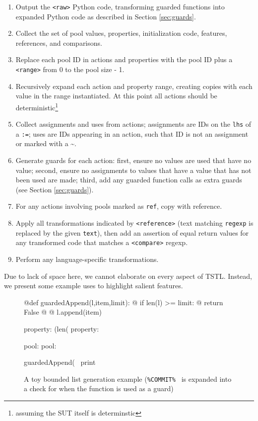 \documentclass[runningheads,a4paper]{llncs}
\begin{document}
\begin{enumerate}
\item Output the {\tt <raw>} Python code, transforming guarded functions into expanded Python code as described in Section \ref{sec:guards}.
\item Collect the set of pool values, properties, initialization code, features, references, and comparisons.
\item Replace each pool ID in actions and properties with the pool ID plus a {\tt <range>} from 0 to the pool size - 1.  
\item Recursively expand each action and property range, creating copies with each value in the range instantiated.  At this point all actions should be deterministic\footnote{assuming the SUT itself is determinstic}
\item Collect assignments and uses from actions; assignments are IDs on the {\tt lhs} of a {\tt :=}; uses are IDs appearing in an action, such that ID is not an assignment or marked with a \textasciitilde.
\item Generate guards for each action:  first, ensure no values are used that have no value; second, ensure no assignments to values that have a value that has not  been used are made; third, add any guarded function calls as extra guards (see Section \ref{sec:guards}).
\item For any actions involving pools marked as {\tt ref},
copy with reference.
\item Apply all transformations indicated
by {\tt <reference>} (text matching {\tt regexp} is replaced by the
given {\tt text}), then add an assertion of equal return values for any
transformed code that matches a {\tt <compare>} regexp.
\item Perform any language-specific transformations.
\end{enumerate}

Due to lack of space here, we cannot elaborate on every aspect of
TSTL.  Instead, we present some example uses to highlight salient features.

\begin{figure}
{\scriptsize
\begin{code}
@def guardedAppend(l,item,limit):
@  if len(l) >= limit:
@    return False
@  %
@  l.append(item)

property: (len(%
property: %

pool: %
pool: %

guardedAppend(~%
print %
\end{code}
}
\caption{A toy bounded list generation example ({\tt \%COMMIT\% } is expanded into a check for when the function is used as a guard) }
\label{fig:toylist}
\end{figure}
\end{document}
